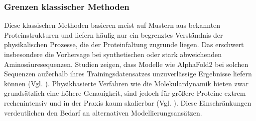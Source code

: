 \subsubsection*{Grenzen klassischer Methoden}
Diese klassischen Methoden basieren meist auf Mustern aus bekannten Proteinstrukturen und liefern häufig nur ein begrenztes Verständnis der physikalischen Prozesse, die der Proteinfaltung zugrunde liegen. Das erschwert insbesondere die Vorhersage bei synthetischen oder stark abweichenden Aminosäuresequenzen. Studien zeigen, dass Modelle wie AlphaFold2 bei solchen Sequenzen außerhalb ihres Trainingsdatensatzes unzuverlässige Ergebnisse liefern können (Vgl. \cite{outeiral2022}). Physikbasierte Verfahren wie die Molekulardynamik bieten zwar grundsätzlich eine höhere Genauigkeit, sind jedoch für größere Proteine extrem rechenintensiv und in der Praxis kaum skalierbar (Vgl. \cite{doga_perspective_2024}). Diese Einschränkungen verdeutlichen den Bedarf an alternativen Modellierungsansätzen.

